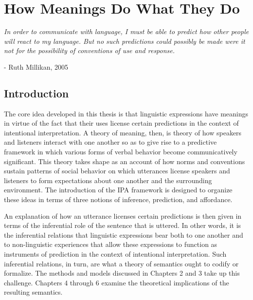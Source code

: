 
\chapter{How Meanings Do What They Do}
\renewcommand{\epigraphrule}{0pt}
\setlength{\epigraphwidth}{4.5in}
\epigraph{\textit{In order to communicate with language, I must be able to predict how other people will react to my language. But no such predictions could possibly be made were it not for the possibility of conventions of use and response.}}{- Ruth Millikan, 2005}

\section{Introduction}

The core idea developed in this thesis is that linguistic expressions have meanings in virtue of the fact that their uses license certain predictions in the context of intentional interpretation. A theory of meaning, then, is theory of how speakers and listeners interact with one another so as to give rise to a predictive framework in which various forms of verbal behavior become communicatively significant. This theory takes shape as an account of how norms and conventions sustain patterns of social behavior on which utterances license speakers and listeners to form expectations about one another and the surrounding environment. The introduction of the IPA framework is designed to organize these ideas in terms of three notions of inference, prediction, and affordance. 

An explanation of how an utterance licenses certain predictions is then given in terms of the inferential role of the sentence that is uttered. In other words, it is the inferential relations that linguistic expressions bear both to one another and to non-linguistic experiences that allow these expressions to function as instruments of prediction in the context of intentional interpretation. Such inferential relations, in turn, are what a theory of semantics ought to codify or formalize. The methods and models discussed in Chapters 2 and 3 take up this challenge. Chapters 4 through 6 examine the theoretical implications of the resulting semantics. 

